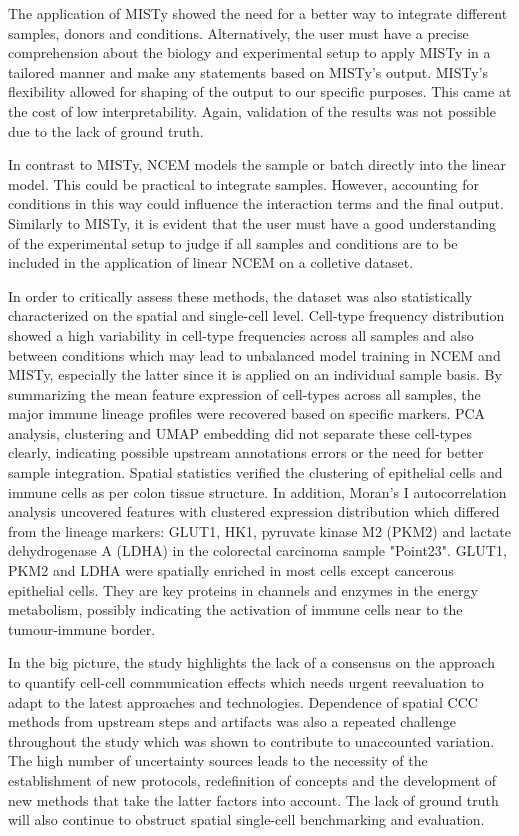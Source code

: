 The application of MISTy showed the need for a better way to integrate different samples, donors and conditions. Alternatively, the user must have a precise comprehension about the biology and experimental setup to apply MISTy in a tailored manner and make any statements based on MISTy's output. MISTy's flexibility allowed for shaping of the output to our specific purposes. This came at the cost of low interpretability. Again, validation of the results was not possible due to the lack of ground truth.

In contrast to MISTy, NCEM models the sample or batch directly into the linear model. This could be practical to integrate samples. However, accounting for conditions in this way could influence the interaction terms and the final output. Similarly to MISTy, it is evident that the user must have a good understanding of the experimental setup to judge if all samples and conditions are to be included in the application of linear NCEM on a colletive dataset.

In order to critically assess these methods, the dataset was also statistically characterized on the spatial and single-cell level. Cell-type frequency distribution showed a high variability in cell-type frequencies across all samples and also between conditions which may lead to unbalanced model training in NCEM and MISTy, especially the latter since it is applied on an individual sample basis. By summarizing the mean feature expression of cell-types across all samples, the major immune lineage profiles were recovered based on specific markers. PCA analysis, clustering and UMAP embedding did not separate these cell-types clearly, indicating possible upstream annotations errors or the need for better sample integration. Spatial statistics verified the clustering of epithelial cells and immune cells as per colon tissue structure. In addition, Moran's I autocorrelation analysis uncovered features with clustered expression distribution which differed from the lineage markers: GLUT1, HK1, pyruvate kinase M2 (PKM2) and lactate dehydrogenase A (LDHA) in the colorectal carcinoma sample "Point23". GLUT1, PKM2 and LDHA were spatially enriched in most cells except cancerous epithelial cells. They are key proteins in channels and enzymes in the energy metabolism, possibly indicating the activation of immune cells near to the tumour-immune border.

In the big picture, the study highlights the lack of a consensus on the approach to quantify cell-cell communication effects which needs urgent reevaluation to adapt to the latest approaches and technologies. Dependence of spatial CCC methods from upstream steps and artifacts was also a repeated challenge throughout the study which was shown to contribute to unaccounted variation. The high number of uncertainty sources leads to the necessity of the establishment of new protocols, redefinition of concepts  and the development of new methods that take the latter factors into account. The lack of ground truth will also continue to obstruct spatial single-cell benchmarking and evaluation.

